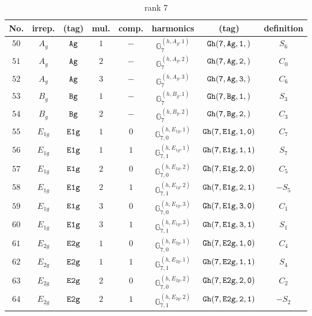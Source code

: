 \documentclass[fleqn,8pt]{jsarticle}
\begin{document}
\begin{table}[ht!]
\begin{center}
\caption{rank 7}
\renewcommand{\arraystretch}{1.3}
\begin{tabular}{cccccccc} \hline \hline
No. & irrep. & (tag) & mul. & comp. & harmonics & (tag) & definition \\ \hline
$ 50 $ & $ A_{g} $ & $ {\tt Ag} $ & $ 1 $ & $ - $ & $ \mathbb{G}_{7}^{(h,A_{g},1)} $ & $ {\tt Gh(7,Ag,1,)} $ & $ S_{6} $ \\
$ 51 $ & $ A_{g} $ & $ {\tt Ag} $ & $ 2 $ & $ - $ & $ \mathbb{G}_{7}^{(h,A_{g},2)} $ & $ {\tt Gh(7,Ag,2,)} $ & $ C_{0} $ \\
$ 52 $ & $ A_{g} $ & $ {\tt Ag} $ & $ 3 $ & $ - $ & $ \mathbb{G}_{7}^{(h,A_{g},3)} $ & $ {\tt Gh(7,Ag,3,)} $ & $ C_{6} $ \\
$ 53 $ & $ B_{g} $ & $ {\tt Bg} $ & $ 1 $ & $ - $ & $ \mathbb{G}_{7}^{(h,B_{g},1)} $ & $ {\tt Gh(7,Bg,1,)} $ & $ S_{3} $ \\
$ 54 $ & $ B_{g} $ & $ {\tt Bg} $ & $ 2 $ & $ - $ & $ \mathbb{G}_{7}^{(h,B_{g},2)} $ & $ {\tt Gh(7,Bg,2,)} $ & $ C_{3} $ \\
$ 55 $ & $ E_{1g} $ & $ {\tt E1g} $ & $ 1 $ & $ 0 $ & $ \mathbb{G}_{7,0}^{(h,E_{1g},1)} $ & $ {\tt Gh(7,E1g,1,0)} $ & $ C_{7} $ \\
$ 56 $ & $ E_{1g} $ & $ {\tt E1g} $ & $ 1 $ & $ 1 $ & $ \mathbb{G}_{7,1}^{(h,E_{1g},1)} $ & $ {\tt Gh(7,E1g,1,1)} $ & $ S_{7} $ \\
$ 57 $ & $ E_{1g} $ & $ {\tt E1g} $ & $ 2 $ & $ 0 $ & $ \mathbb{G}_{7,0}^{(h,E_{1g},2)} $ & $ {\tt Gh(7,E1g,2,0)} $ & $ C_{5} $ \\
$ 58 $ & $ E_{1g} $ & $ {\tt E1g} $ & $ 2 $ & $ 1 $ & $ \mathbb{G}_{7,1}^{(h,E_{1g},2)} $ & $ {\tt Gh(7,E1g,2,1)} $ & $ - S_{5} $ \\
$ 59 $ & $ E_{1g} $ & $ {\tt E1g} $ & $ 3 $ & $ 0 $ & $ \mathbb{G}_{7,0}^{(h,E_{1g},3)} $ & $ {\tt Gh(7,E1g,3,0)} $ & $ C_{1} $ \\
$ 60 $ & $ E_{1g} $ & $ {\tt E1g} $ & $ 3 $ & $ 1 $ & $ \mathbb{G}_{7,1}^{(h,E_{1g},3)} $ & $ {\tt Gh(7,E1g,3,1)} $ & $ S_{1} $ \\
$ 61 $ & $ E_{2g} $ & $ {\tt E2g} $ & $ 1 $ & $ 0 $ & $ \mathbb{G}_{7,0}^{(h,E_{2g},1)} $ & $ {\tt Gh(7,E2g,1,0)} $ & $ C_{4} $ \\
$ 62 $ & $ E_{2g} $ & $ {\tt E2g} $ & $ 1 $ & $ 1 $ & $ \mathbb{G}_{7,1}^{(h,E_{2g},1)} $ & $ {\tt Gh(7,E2g,1,1)} $ & $ S_{4} $ \\
$ 63 $ & $ E_{2g} $ & $ {\tt E2g} $ & $ 2 $ & $ 0 $ & $ \mathbb{G}_{7,0}^{(h,E_{2g},2)} $ & $ {\tt Gh(7,E2g,2,0)} $ & $ C_{2} $ \\
$ 64 $ & $ E_{2g} $ & $ {\tt E2g} $ & $ 2 $ & $ 1 $ & $ \mathbb{G}_{7,1}^{(h,E_{2g},2)} $ & $ {\tt Gh(7,E2g,2,1)} $ & $ - S_{2} $ \\
 \hline \hline
\end{tabular}
\end{center}
\end{table}
\end{document}
